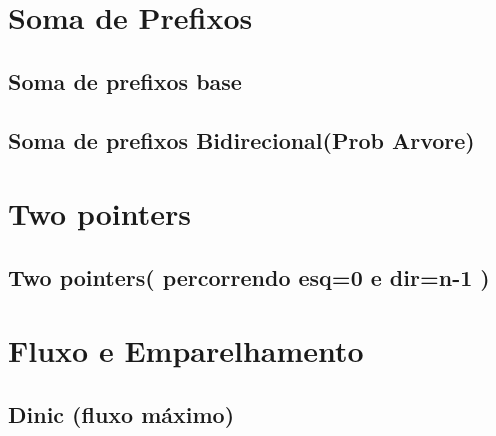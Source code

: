 \section{Soma de Prefixos}

\subsection{Soma de prefixos base}


\subsection{Soma de prefixos Bidirecional(Prob Arvore)}





\section{Two pointers}

\subsection{Two pointers(  percorrendo esq=0 e dir=n-1 )}




\section{Fluxo e Emparelhamento}

\subsection{Dinic (fluxo máximo)}


% 

% 

